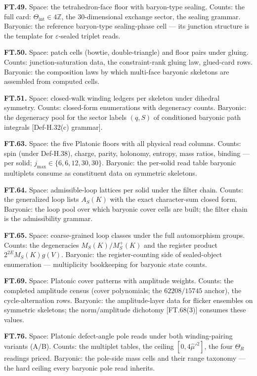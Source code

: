 \textbf{FT.49.} Space: the tetrahedron-face floor with baryon-type sealing. Counts: the full card: $\Theta_{\mathrm{int}}\in4\mathbb Z$, the $30$-dimensional exchange sector, the sealing grammar. Baryonic: the reference baryon-type sealing-phase cell — its junction structure is the template for $\varepsilon$-sealed triplet reads.

\textbf{FT.50.} Space: patch cells (bowtie, double-triangle) and floor pairs under gluing. Counts: junction-saturation data, the constraint-rank gluing law, glued-card rows. Baryonic: the composition laws by which multi-face baryonic skeletons are assembled from computed cells.

\textbf{FT.51.} Space: closed-walk winding ledgers per skeleton under dihedral symmetry. Counts: closed-form enumerations with degeneracy counts. Baryonic: the degeneracy pool for the sector labels $(q,S)$ of conditioned baryonic path integrals [Def-H.32(c) grammar].

\textbf{FT.63.} Space: the five Platonic floors with all physical read columns. Counts: spin (under Def-H.38), charge, parity, holonomy, entropy, mass ratios, binding — per solid; $j_{\max}\in\{6,6,12,30,30\}$. Baryonic: the per-solid read table baryonic multiplets consume as constituent data on symmetric skeletons.

\textbf{FT.64.} Space: admissible-loop lattices per solid under the filter chain. Counts: the generalized loop lists $A_S(K)$ with the exact character-sum closed form. Baryonic: the loop pool over which baryonic cover cells are built; the filter chain is the admissibility grammar.

\textbf{FT.65.} Space: coarse-grained loop classes under the full automorphism groups. Counts: the degeneracies $M_S(K)/M^+_S(K)$ and the register product $2^{2E}M_S(K)g(V)$. Baryonic: the register-counting side of sealed-object enumeration — multiplicity bookkeeping for baryonic state counts.

\textbf{FT.69.} Space: Platonic cover patterns with amplitude weights. Counts: the completed amplitude census (cover polynomials; the $62208/15745$ anchor), the cycle-alternation rows. Baryonic: the amplitude-layer data for flicker ensembles on symmetric skeletons; the norm/amplitude dichotomy [FT.68(3)] consumes these values.

\textbf{FT.76.} Space: Platonic defect-angle pole reads under both winding-pairing variants (A/B). Counts: the multiplet tables, the ceiling $[0,4\hat\mu'^2]$, the four $\Theta_R$ readings priced. Baryonic: the pole-side mass cells and their range taxonomy — the hard ceiling every baryonic pole read inherits.

